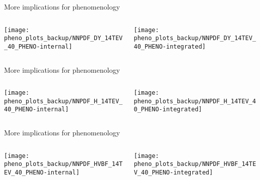\begin{frame}[t]{More implications for phenomenology}
    \begin{center}
        \begin{columns}
	        \begin{column}{0.48\textwidth}
	            \begin{center}
	                \texttt{[image: pheno\_plots\_backup/NNPDF\_DY\_14TEV\_40\_PHENO-internal]} 
	            \end{center}
	        \end{column}
	        \begin{column}{0.48\textwidth}
	            \texttt{[image: pheno\_plots\_backup/NNPDF\_DY\_14TEV\_40\_PHENO-integrated]}
	        \end{column}
        \end{columns}
    \end{center}
\end{frame}

\begin{frame}[t]{More implications for phenomenology}
    \begin{center}
        \begin{columns}
	        \begin{column}{0.48\textwidth}
	            \begin{center}
	                \texttt{[image: pheno\_plots\_backup/NNPDF\_H\_14TEV\_40\_PHENO-internal]} 
	            \end{center}
	        \end{column}
	        \begin{column}{0.48\textwidth}
	            \texttt{[image: pheno\_plots\_backup/NNPDF\_H\_14TEV\_40\_PHENO-integrated]}
	        \end{column}
        \end{columns}
    \end{center}
\end{frame}

\begin{frame}[t]{More implications for phenomenology}
    \begin{center}
        \begin{columns}
	        \begin{column}{0.48\textwidth}
	            \begin{center}
	                \texttt{[image: pheno\_plots\_backup/NNPDF\_HVBF\_14TEV\_40\_PHENO-internal]} 
	            \end{center}
	        \end{column}
	        \begin{column}{0.48\textwidth}
	            \texttt{[image: pheno\_plots\_backup/NNPDF\_HVBF\_14TEV\_40\_PHENO-integrated]}
	        \end{column}
        \end{columns}
    \end{center}
\end{frame}

